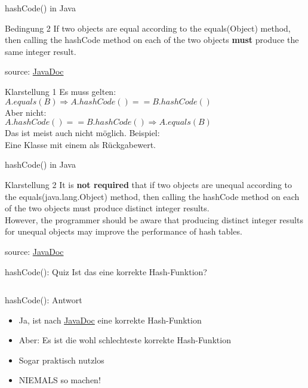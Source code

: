 \documentclass[usepdftitle=false,hyperref={pdfpagelabels=false}]{beamer}
\begin{document}
\begin{frame}{hashCode() in Java}
    \begin{block}{Bedingung 2}
        If two objects are equal according to the equals(Object) 
        method, then calling the hashCode method on each of the two 
        objects \textbf{must} produce the same integer result.
    \end{block}
    {\tiny source: \href{http://docs.oracle.com/javase/7/docs/api/java/lang/Object.html\#hashCode()}{JavaDoc}}

    \pause

    \begin{block}{Klarstellung 1}
        Es muss gelten:\\
        $A.equals(B) \Rightarrow A.hashCode() == B.hashCode()$\\
        Aber nicht:\\
        $A.hashCode() == B.hashCode() \Rightarrow A.equals(B)$\\
        Das ist meist auch nicht möglich. Beispiel:\\
        Eine Klasse mit einem  als Rückgabewert.
    \end{block}
\end{frame}

\begin{frame}{hashCode() in Java}
    \begin{block}{Klarstellung 2}
        It is \textbf{not required} that if two objects are unequal according 
        to the equals(java.lang.Object) method, then calling the 
        hashCode method on each of the two objects must produce 
        distinct integer results.\\
        However, the programmer should be 
        aware that producing distinct integer results for unequal 
        objects may improve the performance of hash tables.
    \end{block}
    {\tiny source: \href{http://docs.oracle.com/javase/7/docs/api/java/lang/Object.html\#hashCode()}{JavaDoc}}
\end{frame}

\begin{frame}{hashCode(): Quiz}
    Ist das eine korrekte Hash-Funktion?
    \inputminted[linenos=true, numbersep=5pt, tabsize=4, fontsize=\tiny]{java}{Country-hashCode.java}
\end{frame}

\begin{frame}{hashCode(): Antwort}
    \begin{itemize}[<+->]
        \item Ja, ist nach \href{http://docs.oracle.com/javase/7/docs/api/java/lang/Object.html\#hashCode()}{JavaDoc} eine korrekte
              Hash-Funktion
        \item Aber: Es ist die wohl schlechteste korrekte Hash-Funktion
        \item Sogar praktisch nutzlos
        \item \alert<5>{NIEMALS} so machen!
    \end{itemize}
\end{frame}
\end{document}

